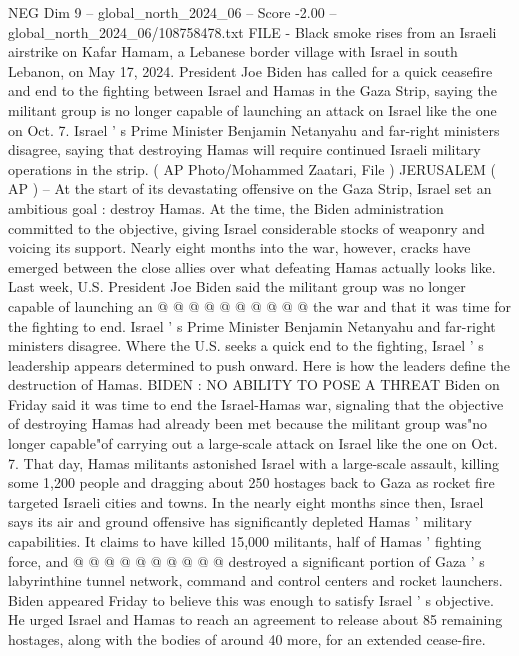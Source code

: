 \begin{textsample}{NEG Dim 9 – global\_north\_2024\_06 – Score -2.00 – global\_north\_2024\_06/108758478.txt}  \label{ex:f9_neg_171}
FILE - Black smoke rises from an Israeli airstrike on Kafar Hamam, a Lebanese border village with Israel in south Lebanon, on May 17, 2024.
President Joe Biden has called for a quick ceasefire and end to the fighting between Israel and Hamas in the Gaza Strip, saying the militant group is no longer capable of launching an attack on Israel like the one on Oct. 7.
Israel ' s Prime Minister Benjamin Netanyahu and far-right ministers disagree, saying that destroying Hamas will require continued Israeli military operations in the strip. ( AP Photo/Mohammed Zaatari, File ) JERUSALEM ( AP ) -- At the start of its devastating offensive on the Gaza Strip, Israel set an ambitious goal : destroy Hamas.
At the time, the Biden administration committed to the objective, giving Israel considerable stocks of weaponry and voicing its support.
Nearly eight months into the war, however, cracks have emerged between the close allies over what defeating Hamas actually looks like.
Last week, U.S.
President Joe Biden said the militant group was no longer capable of launching an @ @ @ @ @ @ @ @ @ @ the war and that it was time for the fighting to end.
Israel ' s Prime Minister Benjamin Netanyahu and far-right ministers disagree.
Where the U.S. seeks a quick end to the fighting, Israel ' s leadership appears determined to push onward.
Here is how the leaders define the destruction of Hamas.
BIDEN : NO ABILITY TO POSE A THREAT Biden on Friday said it was time to end the Israel-Hamas war, signaling that the objective of destroying Hamas had already been met because the militant group was"no longer capable"of carrying out a large-scale attack on Israel like the one on Oct. 7.
That day, Hamas militants astonished Israel with a large-scale assault, killing some 1,200 people and dragging about 250 hostages back to Gaza as rocket fire targeted Israeli cities and towns.
In the nearly eight months since then, Israel says its air and ground offensive has significantly depleted Hamas ' military capabilities.
It claims to have killed 15,000 militants, half of Hamas ' fighting force, and @ @ @ @ @ @ @ @ @ @ destroyed a significant portion of Gaza ' s labyrinthine tunnel network, command and control centers and rocket launchers.
Biden appeared Friday to believe this was enough to satisfy Israel ' s objective.
He urged Israel and Hamas to reach an agreement to release about 85 remaining hostages, along with the bodies of around 40 more, for an extended cease-fire.

\end{textsample}
